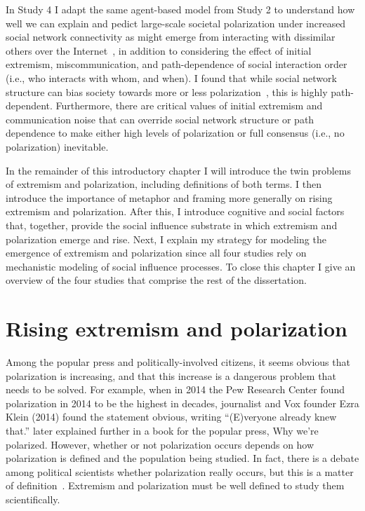 \documentclass[12pt,letterpaper]{article}
\begin{document}
In Study 4 I adapt the same agent-based
model from Study 2 to understand how well we can explain and pedict large-scale
societal polarization under increased 
social network connectivity as might emerge from interacting with dissimilar
others over the Internet~\cite{Bail2018}, in addition to considering the effect
of initial extremism, miscommunication, and path-dependence of social interaction
order (i.e., who interacts with whom, and when). I found that while social network
structure can bias society towards more or less polarization~\cite{Flache2011}, 
this is highly path-dependent. Furthermore, there are critical values of initial extremism
and communication noise that can override social network structure or path 
dependence to make either high levels of polarization or full consensus 
(i.e., no polarization) inevitable.

In the remainder of this introductory chapter I will introduce the 
twin problems of extremism and polarization, including definitions of both
terms. I then introduce the importance of metaphor and framing more generally
on rising extremism and polarization. After this, I introduce cognitive and
social factors that, together, provide the social influence substrate in which extremism 
and polarization emerge and rise. Next, I explain my strategy for modeling the emergence of 
extremism and polarization since all four studies rely on mechanistic modeling
of social influence processes. To close this chapter I give an overview of the
four studies that comprise the rest of the dissertation.


\section{Rising extremism and polarization}

Among the popular press and politically-involved citizens, it seems obvious
that polarization is increasing, and that this increase is a 
dangerous problem that needs to be solved. 
For example, when in 2014 the Pew Research Center found polarization
in 2014 to be the highest in decades, journalist and Vox founder Ezra Klein 
(2014) found the statement obvious, writing ``(E)veryone already knew that.''
 later explained further in a book for the popular press,
{Why we're polarized}. 
However, whether or not polarization occurs depends on how polarization 
is defined and the population being studied. 
In fact, there is a debate among political scientists whether
polarization really occurs, but this is a matter of definition~\cite{Mason2015,Lelkes2016,Kinder2017}.
Extremism and polarization must be well defined to study them scientifically.
\end{document}
